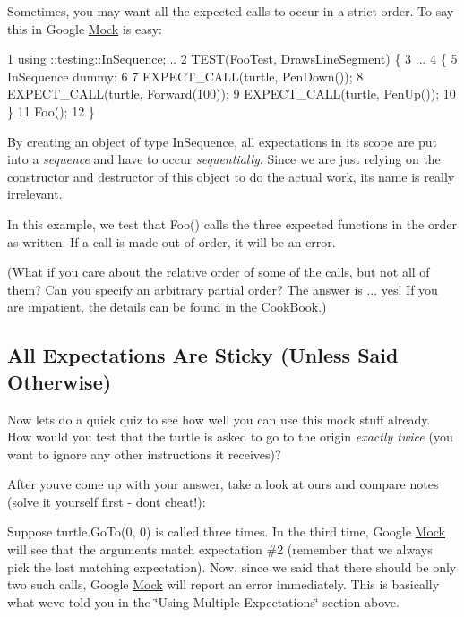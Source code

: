 Sometimes, you may want all the expected calls to occur in a strict order. To say this in Google \hyperlink{classMock}{Mock} is easy\+:


\begin{DoxyCode}
1 using ::testing::InSequence;...
2 TEST(FooTest, DrawsLineSegment) \{
3   ...
4   \{
5     InSequence dummy;
6 
7     EXPECT\_CALL(turtle, PenDown());
8     EXPECT\_CALL(turtle, Forward(100));
9     EXPECT\_CALL(turtle, PenUp());
10   \}
11   Foo();
12 \}
\end{DoxyCode}


By creating an object of type {\ttfamily In\+Sequence}, all expectations in its scope are put into a {\itshape sequence} and have to occur {\itshape sequentially}. Since we are just relying on the constructor and destructor of this object to do the actual work, its name is really irrelevant.

In this example, we test that {\ttfamily Foo()} calls the three expected functions in the order as written. If a call is made out-\/of-\/order, it will be an error.

(What if you care about the relative order of some of the calls, but not all of them? Can you specify an arbitrary partial order? The answer is ... yes! If you are impatient, the details can be found in the Cook\+Book.)

\subsection*{All Expectations Are Sticky (Unless Said Otherwise)}

Now let\textquotesingle{}s do a quick quiz to see how well you can use this mock stuff already. How would you test that the turtle is asked to go to the origin {\itshape exactly twice} (you want to ignore any other instructions it receives)?

After you\textquotesingle{}ve come up with your answer, take a look at ours and compare notes (solve it yourself first -\/ don\textquotesingle{}t cheat!)\+:




Suppose {\ttfamily turtle.\+Go\+To(0, 0)} is called three times. In the third time, Google \hyperlink{classMock}{Mock} will see that the arguments match expectation \#2 (remember that we always pick the last matching expectation). Now, since we said that there should be only two such calls, Google \hyperlink{classMock}{Mock} will report an error immediately. This is basically what we\textquotesingle{}ve told you in the \char`\"{}\+Using Multiple Expectations\char`\"{} section above.

